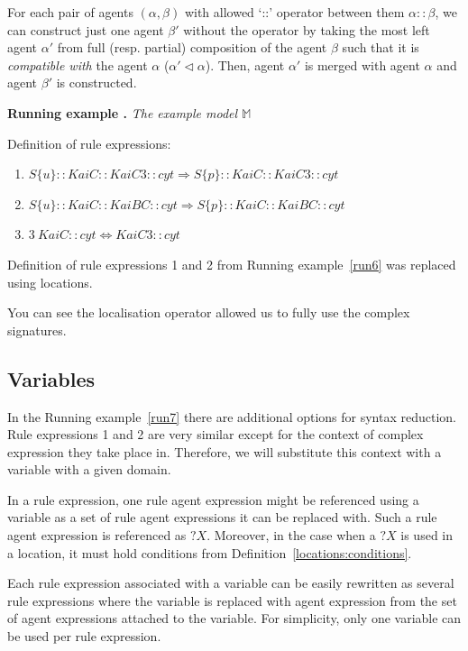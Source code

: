 \documentclass[12pt, twoside]{fithesis2} %
\newcounter{counter}[section]
\renewcommand{\thecounter}{\thesection.\arabic{counter}}
\newenvironment{runningExample}[1]{\bigskip\refstepcounter{counter}\noindent\textbf{Running example \thecounter} \emph{#1} \par\nopagebreak}{\bigskip}
\begin{document}
For each pair of agents $(\alpha, \beta)$ with allowed `::' operator between them $\alpha :: \beta$, we can construct just one agent $\beta'$ without the operator by taking the most left agent $\alpha'$ from full (resp. partial) composition of the agent $\beta$ such that it is \emph{compatible with} the agent $\alpha$ ($\alpha' \lhd \alpha$). Then, agent $\alpha'$ is merged with agent $\alpha$ and agent $\beta'$ is constructed.

\begin{runningExample}{The example model $\mathds{M}$}
\label{run7}
\noindent Definition of rule expressions:
{\small
\begin{enumerate}
\item $S\{u\}::KaiC::KaiC3::cyt \Rightarrow S\{p\}::KaiC::KaiC3::cyt$
\item $S\{u\}::KaiC::KaiBC::cyt \Rightarrow S\{p\}::KaiC::KaiBC::cyt$
\item $3~KaiC::cyt \Leftrightarrow KaiC3::cyt$
\end{enumerate}
}
\end{runningExample}

\noindent Definition of rule expressions 1 and 2 from Running example~\ref{run6} was replaced using locations.

You can see the localisation operator allowed us to fully use the complex signatures.

\subsection{Variables}

In the Running example~\ref{run7} there are additional options for syntax reduction. Rule expressions 1 and 2 are very similar except for the context of complex expression they take place in. Therefore, we will substitute this context with a variable with a given domain.

In a rule expression, one rule agent expression might be referenced using a variable as a set of rule agent expressions it can be replaced with. Such a rule agent expression is referenced as $?X$. Moreover, in the case when a $?X$ is used in a location, it must hold conditions from Definition~\ref{locations:conditions}.

Each rule expression associated with a variable can be easily rewritten as several rule expressions where the variable is replaced with agent expression from the set of agent expressions attached to the variable. For simplicity, only one variable can be used per rule expression.
\end{document}
